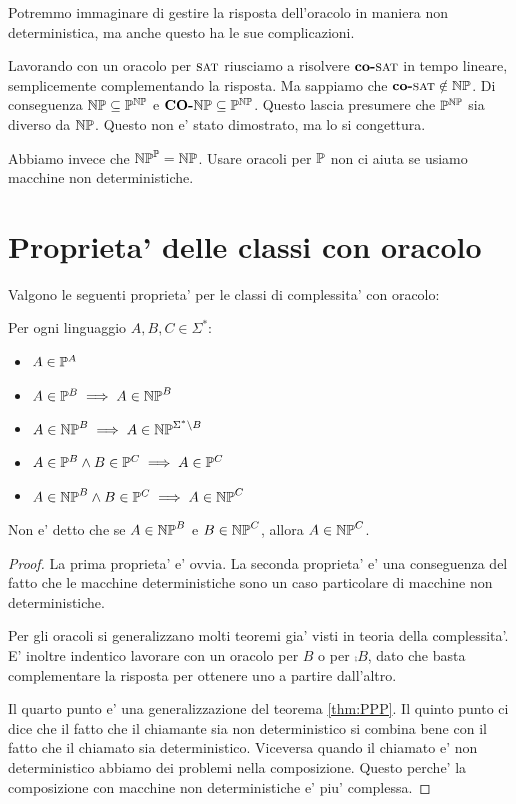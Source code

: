 Potremmo immaginare di gestire la risposta dell'oracolo in maniera non deterministica, ma anche
questo ha le sue complicazioni.

Lavorando con un oracolo per $\textsc{sat}$ riusciamo a risolvere $\textbf{co-}\textsc{sat}$ in tempo lineare, semplicemente
complementando la risposta. Ma sappiamo che $\textbf{co-}\textsc{sat} \notin \mathbb{NP}$. Di conseguenza $\mathbb{NP}
\subseteq \mathbb{P}^{\mathbb{NP}}$ e $\textbf{CO-}\mathbb{NP} \subseteq \mathbb{P}^{\mathbb{NP}}$. Questo lascia presumere che
$\mathbb{P}^{\mathbb{NP}}$ sia diverso da $\mathbb{NP}$. Questo non e' stato dimostrato, ma lo si congettura.

Abbiamo invece che $\mathbb{NP}^{\mathbb{P}} = \mathbb{NP}$. Usare oracoli per $\mathbb{P}$ non ci aiuta se
usiamo macchine non deterministiche.

\section{Proprieta' delle classi con oracolo}

Valgono le seguenti proprieta' per le classi di complessita' con oracolo:
\begin{thm}
    Per ogni linguaggio $A,B,C \in \Sigma^{*}$:
    \begin{itemize}
        \item $A \in \mathbb{P}^{A}$
        \item $A \in \mathbb{P}^{B} \implies A \in \mathbb{NP}^{B}$
        \item $A \in \mathbb{NP}^{B} \implies A \in \mathbb{NP}^{\Sigma^{*} \setminus B}$
        \item $A \in \mathbb{P}^{B} \land B \in \mathbb{P}^{C} \implies A \in \mathbb{P}^{C}$
        \item $A \in \mathbb{NP}^{B} \land B \in \mathbb{P}^{C} \implies A \in \mathbb{NP}^{C}$
    \end{itemize}
\end{thm}

Non e' detto che se $A \in \mathbb{NP}^{B}$ e $B \in \mathbb{NP}^{C}$, allora $A \in \mathbb{NP}^{C}$.

\begin{proof}
    La prima proprieta' e' ovvia. La seconda proprieta' e' una conseguenza del fatto che le macchine
    deterministiche sono un caso particolare di macchine non deterministiche. 

    Per gli oracoli si generalizzano molti teoremi gia' visti in teoria della complessita'. E' inoltre
    indentico lavorare con un oracolo per $B$ o per $\comp{B}$, dato che basta complementare la risposta
    per ottenere uno a partire dall'altro. 

    Il quarto punto e' una generalizzazione del teorema \ref{thm:PPP}. Il quinto punto ci dice che
    il fatto che il chiamante sia non deterministico si combina bene con il fatto che il chiamato
    sia deterministico. Viceversa quando il chiamato e' non deterministico abbiamo dei problemi
    nella composizione. Questo perche' la composizione con macchine non deterministiche e' piu'
    complessa. 

\end{proof}

